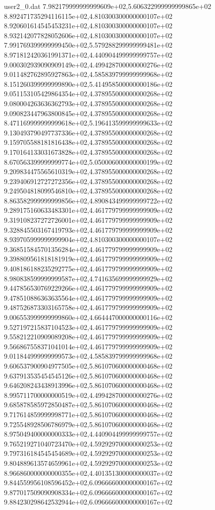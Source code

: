 \begin{filecontents}{user2_0.dat}
7.982179999999999609e+02,5.606322999999999865e+02
8.892471735294116115e+02,4.810300300000000107e+02
8.920601614545453231e+02,4.810300300000000107e+02
8.932142077828052606e+02,4.810300300000000107e+02
7.991769399999999450e+02,5.579288299999999481e+02
8.971812420361991371e+02,4.440904499999999757e+02
9.000302939090909149e+02,4.499428700000000276e+02
9.011482762895927863e+02,4.585839799999999968e+02
8.151260399999999890e+02,5.414958500000000186e+02
9.051153105429864354e+02,4.378955000000000268e+02
9.080004263636362793e+02,4.378955000000000268e+02
9.090823447963800845e+02,4.378955000000000268e+02
8.471169999999999618e+02,5.196413599999999633e+02
9.130493790497737336e+02,4.378955000000000268e+02
9.159705588181816438e+02,4.378955000000000268e+02
9.170164133031673828e+02,4.378955000000000268e+02
8.670563399999999774e+02,5.050006000000000199e+02
9.209834475565610319e+02,4.378955000000000268e+02
9.239406912727272356e+02,4.378955000000000268e+02
9.249504818099546810e+02,4.378955000000000268e+02
8.863582999999999856e+02,4.890843499999999722e+02
9.289175160633483301e+02,4.461779799999999909e+02
9.319108237272726001e+02,4.461779799999999909e+02
9.328845503167419793e+02,4.461779799999999909e+02
8.939705999999999904e+02,4.810300300000000107e+02
9.368515845701356284e+02,4.461779799999999909e+02
9.398809561818181919e+02,4.461779799999999909e+02
9.408186188235292775e+02,4.461779799999999909e+02
8.980838599999999587e+02,4.741635699999999929e+02
9.447856530769229266e+02,4.461779799999999909e+02
9.478510886363635564e+02,4.461779799999999909e+02
9.487526873303165758e+02,4.461779799999999909e+02
9.006553999999999860e+02,4.664447000000000116e+02
9.527197215837104523e+02,4.461779799999999909e+02
9.558212210909089208e+02,4.461779799999999909e+02
9.566867558371041014e+02,4.461779799999999909e+02
9.011844999999999573e+02,4.585839799999999968e+02
9.606537900904977505e+02,5.861070600000000468e+02
9.637913535454545126e+02,5.861070600000000468e+02
9.646208243438913996e+02,5.861070600000000468e+02
8.995711700000000519e+02,4.499428700000000276e+02
9.685878585972850487e+02,5.861070600000000468e+02
9.717614859999998771e+02,5.861070600000000468e+02
9.725548928506786979e+02,5.861070600000000468e+02
8.975049400000000333e+02,4.440904499999999757e+02
9.765219271040723470e+02,4.592929700000000253e+02
9.797316184545454689e+02,4.592929700000000253e+02
9.804889613574659961e+02,4.592929700000000253e+02
8.966860000000000355e+02,4.401351300000000037e+02
9.844559956108596452e+02,6.096666000000000167e+02
9.877017509090908334e+02,6.096666000000000167e+02
9.884230298642532944e+02,6.096666000000000167e+02

\end{filecontents}
